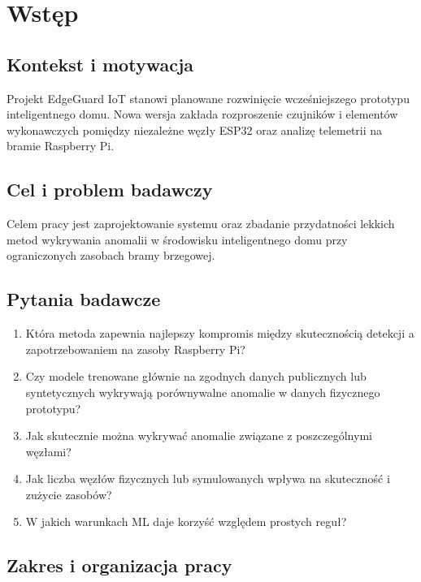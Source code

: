 \chapter{Wstęp}
\label{chap:introduction}
\section{Kontekst i motywacja}
Projekt EdgeGuard IoT stanowi planowane rozwinięcie wcześniejszego prototypu inteligentnego domu. Nowa wersja zakłada rozproszenie czujników i elementów wykonawczych pomiędzy niezależne węzły ESP32 oraz analizę telemetrii na bramie Raspberry Pi.

\section{Cel i problem badawczy}
Celem pracy jest zaprojektowanie systemu oraz zbadanie przydatności lekkich metod wykrywania anomalii w środowisku inteligentnego domu przy ograniczonych zasobach bramy brzegowej.

\section{Pytania badawcze}
\begingroup\small\singlespacing
\begin{enumerate}[label=RQ\arabic*:,leftmargin=1.5cm]
\item Która metoda zapewnia najlepszy kompromis między skutecznością detekcji a zapotrzebowaniem na zasoby Raspberry Pi?
\item Czy modele trenowane głównie na zgodnych danych publicznych lub syntetycznych wykrywają porównywalne anomalie w danych fizycznego prototypu?
\item Jak skutecznie można wykrywać anomalie związane z poszczególnymi węzłami?
\item Jak liczba węzłów fizycznych lub symulowanych wpływa na skuteczność i zużycie zasobów?
\item W jakich warunkach ML daje korzyść względem prostych reguł?
\end{enumerate}
\endgroup

\section{Zakres i organizacja pracy}
